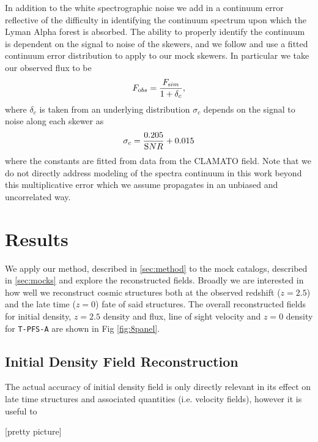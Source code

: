 \documentclass[usenatbib,onecolumn]{mnras}
\begin{document}
In addition to the white spectrographic noise we add in a continuum error reflective of the difficulty in identifying the continuum spectrum upon which the Lyman Alpha forest is absorbed. The ability to properly identify the continuum is dependent on the signal to noise of the skewers, and we follow \cite{2018Krolewski} and use a fitted continuum error distribution to apply to our mock skewers. In particular we take our observed flux to be 
\begin{equation}
    F_{\textrm obs} = \frac{F_{\text sim}}{1+\delta_c},
\end{equation}
where $\delta_c$ is taken from an underlying distribution $\sigma_c$ depends on the signal to noise along each skewer as
\begin{equation}
 \sigma_c = \frac{0.205}{{\textrm SNR}} + 0.015
\end{equation}
where the constants are fitted from data from the CLAMATO field. Note that we do not directly address modeling of the spectra continuum in this work beyond this multiplicative error which we assume propagates in an unbiased and uncorrelated way. %



\section{Results}

We apply our method, described in \ref{sec:method} to the mock catalogs, described in \ref{sec:mocks} and explore the reconstructed fields. Broadly we are interested in how well we reconstruct cosmic structures both at the observed redshift ($z=2.5$) and the late time ($z=0$) fate of said structures. The overall reconstructed fields for initial density, $z=2.5$ density and flux, line of sight velocity and $z=0$ density for \texttt{T-PFS-A} are shown in Fig \ref{fig:8panel}.

\subsection{Initial Density Field Reconstruction}

The actual accuracy of initial density field is only directly relevant in its effect on late time structures and associated quantities (i.e. velocity fields), however it is useful to 

[pretty picture]
\end{document}
